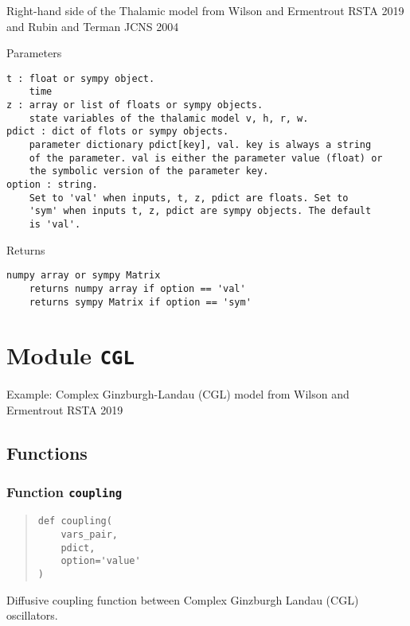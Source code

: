 \documentclass[english,a4paper,oneside]{article}
\begin{document}
Right-hand side of the Thalamic model from Wilson and Ermentrout RSTA
2019 and Rubin and Terman JCNS 2004

Parameters

\begin{verbatim}
t : float or sympy object.
    time
z : array or list of floats or sympy objects.
    state variables of the thalamic model v, h, r, w.
pdict : dict of flots or sympy objects.
    parameter dictionary pdict[key], val. key is always a string
    of the parameter. val is either the parameter value (float) or 
    the symbolic version of the parameter key.
option : string.
    Set to 'val' when inputs, t, z, pdict are floats. Set to
    'sym' when inputs t, z, pdict are sympy objects. The default
    is 'val'.
\end{verbatim}

Returns

\begin{verbatim}
numpy array or sympy Matrix
    returns numpy array if option == 'val'
    returns sympy Matrix if option == 'sym'
\end{verbatim}

\hypertarget{CGL}{%
\section{\texorpdfstring{Module \texttt{CGL}}{Module CGL}}\label{CGL}}

Example: Complex Ginzburgh-Landau (CGL) model from Wilson and Ermentrout
RSTA 2019

\hypertarget{functions-2}{%
\subsection{Functions}\label{functions-2}}

\hypertarget{CGL.coupling}{%
\subsubsection{\texorpdfstring{Function
\texttt{coupling}}{Function coupling}}\label{CGL.coupling}}

\begin{quote}
\begin{verbatim}
def coupling(
    vars_pair,
    pdict,
    option='value'
)
\end{verbatim}
\end{quote}

Diffusive coupling function between Complex Ginzburgh Landau (CGL)
oscillators.
\end{document}
